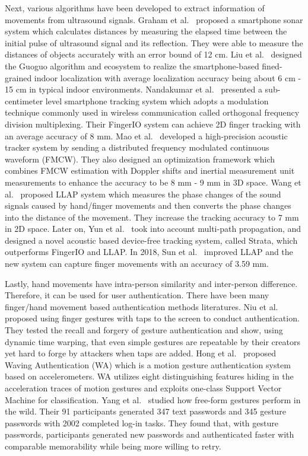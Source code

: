 Next, various algorithms have been developed to extract information of movements from ultrasound signals.  Graham et al.~\cite{graham2015software} proposed a smartphone sonar system which calculates distances by measuring the elapsed time between the initial pulse of ultrasound signal and its reflection. They were able to measure the distances of objects accurately with an error bound of 12 cm. Liu et al.~\cite{liu2015guoguo} designed the Guoguo algorithm and ecosystem to realize the smartphone-based fined-grained indoor localization with average localization accuracy being about 6 cm - 15 cm in typical indoor environments. Nandakumar et al.~\cite{nandakumar2016fingerio} presented a sub-centimeter level smartphone tracking system which adopts a modulation technique commonly used in wireless communication called orthogonal frequency division multiplexing. Their FingerIO system can achieve 2D finger tracking with an average accuracy of 8 mm. Mao et al.~\cite{mao2016cat} developed a high-precision acoustic tracker system by sending a distributed frequency
modulated continuous waveform (FMCW). They also designed an optimization framework which combines FMCW estimation with Doppler shifts and inertial measurement unit measurements to enhance the accuracy to be 8 mm - 9 mm in 3D space. Wang et al.~\cite{wang2016device} proposed LLAP system which measures the phase changes of the sound signals caused by hand/finger movements and then converts the phase changes into the distance of the movement. They increase the tracking accuracy to 7 mm in 2D space. Later on, Yun et al.~\cite{yun2017strata}  took into account multi-path propagation, and designed a novel acoustic based device-free tracking system, called Strata, which outperforms FingerIO and LLAP. In 2018, Sun et al.~\cite{sun2018vskin} improved LLAP and  the new system can capture finger movements with an accuracy of 3.59 mm. 

Lastly, hand movements have intra-person similarity and inter-person difference. Therefore, it can be used for user authentication. There have been many finger/hand movement based authentication methods literatures. Niu et al.~\cite{niu2011gesture} proposed using finger gestures with taps to the screen to conduct authentication. They tested the recall and forgery of gesture authentication and show, using dynamic time warping, that even simple gestures are repeatable by their creators yet hard to forge by attackers when taps are added. Hong et al.~\cite{hong2015waving} proposed Waving Authentication (WA) which is a motion gesture authentication system based on accelerometers. WA utilizes eight distinguishing features hiding in the acceleration traces of motion gestures and exploits one-class Support Vector Machine for classification. Yang et al.~\cite{yang2016free} studied how free-form gestures perform in the wild. Their 91 participants generated 347 text passwords and 345 gesture passwords with 2002 completed log-in tasks. They found that, with gesture passwords, participants generated new passwords and authenticated faster with comparable memorability while being more willing to retry. 

